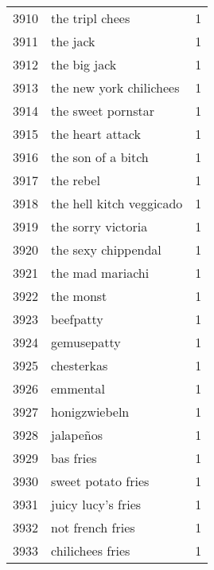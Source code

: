 \begin{tabular}{llr}
3910 &                                    the tripl chees &      1 \\
3911 &                                           the jack &      1 \\
3912 &                                       the big jack &      1 \\
3913 &                            the new york chilichees &      1 \\
3914 &                                 the sweet pornstar &      1 \\
3915 &                                   the heart attack &      1 \\
3916 &                                 the son of a bitch &      1 \\
3917 &                                          the rebel &      1 \\
3918 &                           the hell kitch veggicado &      1 \\
3919 &                                 the sorry victoria &      1 \\
3920 &                                the sexy chippendal &      1 \\
3921 &                                   the mad mariachi &      1 \\
3922 &                                          the monst &      1 \\
3923 &                                          beefpatty &      1 \\
3924 &                                        gemusepatty &      1 \\
3925 &                                         chesterkas &      1 \\
3926 &                                           emmental &      1 \\
3927 &                                      honigzwiebeln &      1 \\
3928 &                                          jalapeños &      1 \\
3929 &                                          bas fries &      1 \\
3930 &                                 sweet potato fries &      1 \\
3931 &                                 juicy lucy’s fries &      1 \\
3932 &                                   not french fries &      1 \\
3933 &                                   chilichees fries &      1 \\

\end{tabular}
